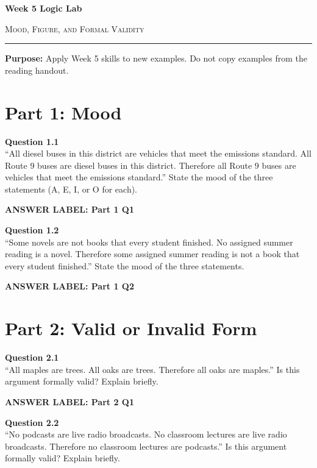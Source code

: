 \documentclass[12pt]{article}
\newcommand{\answerbox}[2]{%
\vspace{0.15em}
\noindent\textbf{#1}\par
\vspace{0.05em}
\noindent\fbox{%
\begin{minipage}[t][#2]{\dimexpr\textwidth-2\fboxsep-2\fboxrule}
\rule{\textwidth}{0pt}
\vspace{#2}
\end{minipage}
}\par
\vspace{0.25em}
}
\begin{document}
\begin{center}
{\LARGE\bfseries Week 5 Logic Lab}\par\vspace{0.05em}
{\large\scshape Mood, Figure, and Formal Validity}\par\vspace{0.1em}
\rule{0.78\textwidth}{0.5pt}\par\vspace{0.15em}
\end{center}

\noindent\textbf{Purpose:} Apply Week 5 skills to new examples. Do not copy examples from the reading handout.

\vspace{0.3em}

\section*{Part 1: Mood}

\textbf{Question 1.1}\\[-0.15em]
``All diesel buses in this district are vehicles that meet the emissions standard. All Route 9 buses are diesel buses in this district. Therefore all Route 9 buses are vehicles that meet the emissions standard.'' State the mood of the three statements (A, E, I, or O for each).

\answerbox{ANSWER LABEL: Part 1 Q1}{1.85in}

\textbf{Question 1.2}\\[-0.15em]
``Some novels are not books that every student finished. No assigned summer reading is a novel. Therefore some assigned summer reading is not a book that every student finished.'' State the mood of the three statements.

\answerbox{ANSWER LABEL: Part 1 Q2}{1.85in}

\newpage

\section*{Part 2: Valid or Invalid Form}

\textbf{Question 2.1}\\[-0.15em]
``All maples are trees. All oaks are trees. Therefore all oaks are maples.'' Is this argument formally valid? Explain briefly.

\answerbox{ANSWER LABEL: Part 2 Q1}{2.35in}

\textbf{Question 2.2}\\[-0.15em]
``No podcasts are live radio broadcasts. No classroom lectures are live radio broadcasts. Therefore no classroom lectures are podcasts.'' Is this argument formally valid? Explain briefly.
\end{document}
